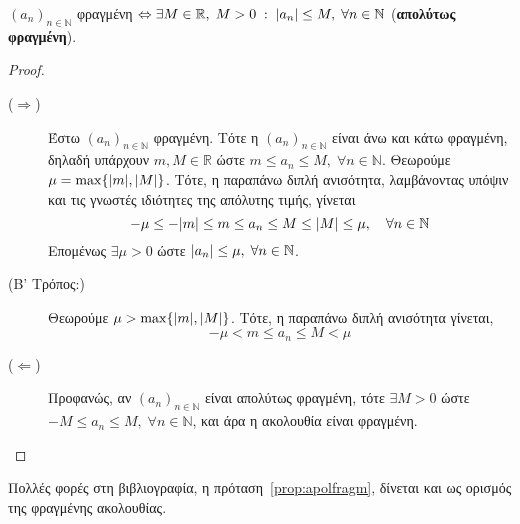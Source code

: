 \documentclass[a4paper,table]{report}
\begin{document}
\begin{mybox3}
  \begin{prop}\label{prop:apolfragm}
    {$ (a_{n})_{n \in \mathbb{N}} $ φραγμένη $ \Leftrightarrow \exists M \in 
      \mathbb{R}, \; M>0 \; : \; \abs{a_{n}} \leq M, \; \forall n \in \mathbb{N} $ 
    (\textbf{απολύτως φραγμένη}).}
  \end{prop}
\end{mybox3}
\begin{proof}
\item {}
  \begin{description}
    \item [($ \Rightarrow $)] Έστω $ (a_{n})_{n \in \mathbb{N}} $ φραγμένη. Τότε η 
      $ (a_{n})_{n \in \mathbb{N}} $ είναι άνω και κάτω φραγμένη, δηλαδή υπάρχουν 
      $ m,M \in \mathbb{R} $ ώστε $ m \leq a_{n} \leq M, \; \forall n \in \mathbb{N} $.
      Θεωρούμε $ \mu = \max \{ \abs{m} , \abs{M} \} $. Τότε, η παραπάνω διπλή 
      ανισότητα, λαμβάνοντας υπόψιν και τις γνωστές ιδιότητες της απόλυτης τιμής, 
      γίνεται
      \[
        - \mu \leq - \abs{m} \leq m \leq a_{n} \leq M \leq \abs{M} \leq \mu , 
        \quad \forall n \in \mathbb{N}
      \]
      Επομένως $ \exists \mu > 0 $ ώστε 
      $ \abs{a_{n}} \leq \mu, \; \forall n \in \mathbb{N} $.

    \item[(Β' Τρόπος:)]
      Θεωρούμε $ \mu > \max \{ \abs{m} , \abs{M} \} $. Τότε, η παραπάνω διπλή 
      ανισότητα γίνεται,
      \[
        - \mu < m \leq a_{n} \leq M < \mu  
      \] 

    \item [($ \Leftarrow$)] Προφανώς, αν $( a_{n})_{n \in \mathbb{N}} $ είναι 
      απολύτως φραγμένη, τότε $ \exists M>0 $ ώστε $ -M \leq a_{n} \leq M, \; \forall n
      \in \mathbb{N} $, και άρα η ακολουθία είναι φραγμένη. 
  \end{description}
\end{proof}

\begin{rem}
  Πολλές φορές στη βιβλιογραφία, η πρόταση~\ref{prop:apolfragm}, 
  δίνεται και ως ορισμός της φραγμένης ακολουθίας.
\end{rem}
\end{document}
